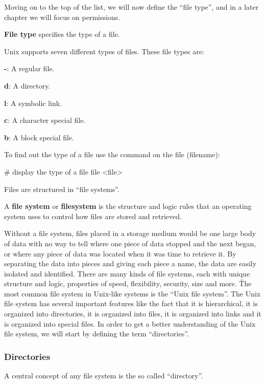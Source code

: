 Moving on to the top of the list, we will now define the ``file type'', and in a later chapter we will focus on
permissions.

\textbf{File type} specifies the type of a file.
\ed

Unix supports seven different types of files. These file types are:
\bit
\item \textbf{-}: A regular file.
\item \textbf{d}: A directory.
\item \textbf{l}: A symbolic link.
\item \textbf{c}: A character special file.
\item \textbf{b}: A block special file.
\eit

To find out the type of a file use the  command on the file (filename):
\begin{bash}
# display the type of a file
file <file>
\end{bash}

Files are structured in ``file systems''.

A \textbf{file system} or \textbf{filesystem} is the structure and logic rules that an operating system uses to control
how files are stored and retrieved.
\ed

Without a file system, files placed in a storage medium would be one large body of data with no way to tell where one
piece of data stopped and the next began, or where any piece of data was located when it was time to retrieve it. By
separating the data into pieces and giving each piece a name, the data are easily isolated and identified. There are
many kinds of file systems, each with unique structure and logic, properties of speed, flexibility, security, size
and more. \v

The most common file system in Unix-like systems is the ``Unix file system''. The Unix file system has several
important features like the fact that it is hierarchical, it is organized into directories, it is organized into files,
it is organized into links and it is organized into special files. In order to get a better understanding of the Unix
file system, we will start by defining the term ``directories''.

\subsubsection{Directories}

A central concept of any file system is the so called ``directory''.

